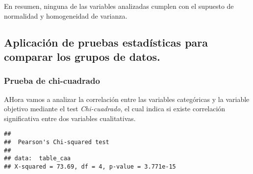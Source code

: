 \documentclass[
]{article}
\newenvironment{Shaded}{\begin{snugshade}}{\end{snugshade}}
\newcommand{\CommentTok}[1]{\textcolor[rgb]{0.56,0.35,0.01}{\textit{#1}}}
\newcommand{\FunctionTok}[1]{\textcolor[rgb]{0.00,0.00,0.00}{#1}}
\newcommand{\NormalTok}[1]{#1}
\newcommand{\OtherTok}[1]{\textcolor[rgb]{0.56,0.35,0.01}{#1}}
\newcommand{\SpecialCharTok}[1]{\textcolor[rgb]{0.00,0.00,0.00}{#1}}
\begin{document}
En resumen, ninguna de las variables analizadas cumplen con el supuesto
de normalidad y homogeneidad de varianza.

\hypertarget{aplicaciuxf3n-de-pruebas-estaduxedsticas-para-comparar-los-grupos-de-datos.}{%
\subsection{Aplicación de pruebas estadísticas para comparar los grupos
de
datos.}\label{aplicaciuxf3n-de-pruebas-estaduxedsticas-para-comparar-los-grupos-de-datos.}}

\hypertarget{prueba-de-chi-cuadrado}{%
\subsubsection{Prueba de chi-cuadrado}\label{prueba-de-chi-cuadrado}}

AHora vamos a analizar la correlación entre las variables categóricas y
la variable objetivo mediante el test \emph{Chi-cuadrado}, el cual
indica si existe correlación significativa entre dos variables
cualitativas.

\begin{Shaded}
\end{Shaded}

\begin{verbatim}
## 
##  Pearson's Chi-squared test
## 
## data:  table_caa
## X-squared = 73.69, df = 4, p-value = 3.771e-15
\end{verbatim}

\begin{Shaded}
\end{Shaded}
\end{document}
